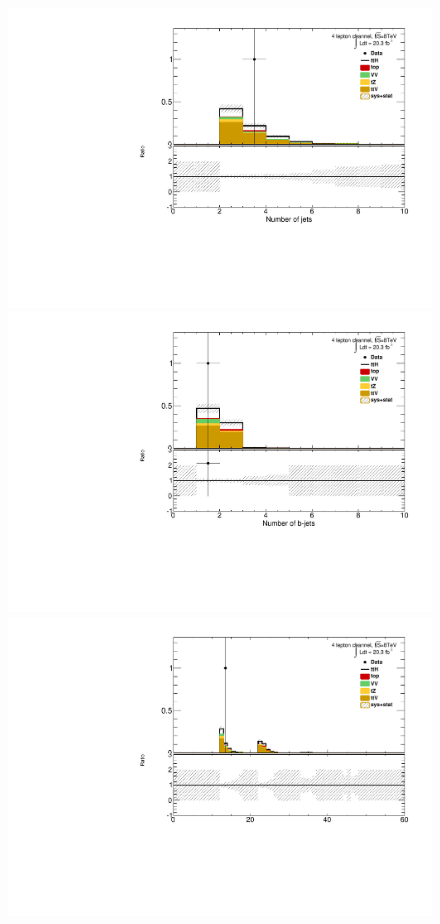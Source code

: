 \begin{figure}[!htbp]
  \begin{minipage}[h]{0.5\textwidth}
    \centering \includegraphics[width=\textwidth]{figs/results/plotCand_4lep_NJet}
  \end{minipage}\hfill
  \begin{minipage}[h]{0.5\textwidth}
    \centering \includegraphics[width=\textwidth]{figs/results/plotCand_4lep_NJetBTag}
  \end{minipage}\hfill
  \begin{minipage}[h]{0.5\textwidth}
    \centering \includegraphics[width=\textwidth]{figs/results/plotCand_4lep_NJet10}

\end{minipage}
\end{figure}
